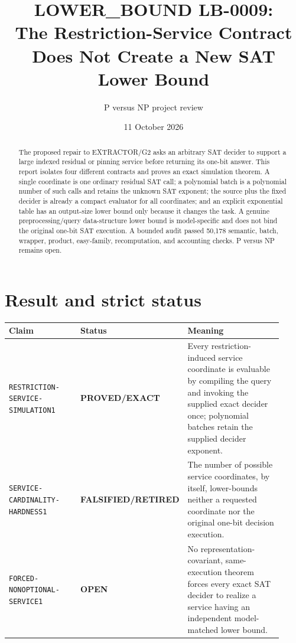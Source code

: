 \documentclass[11pt]{article}
\title{LOWER\_BOUND LB-0009:\\
The Restriction-Service Contract Does Not Create a New SAT Lower Bound}
\author{P versus NP project review}
\date{11 October 2026}
\newcommand{\OPEN}{\textbf{OPEN}}
\newcommand{\EXACT}{\textbf{PROVED/EXACT}}
\newcommand{\RETIRED}{\textbf{FALSIFIED/RETIRED}}
\begin{document}
\maketitle

\begin{abstract}
The proposed repair to EXTRACTOR/G2 asks an arbitrary SAT decider to support
a large indexed residual or pinning service before returning its one-bit
answer.  This report isolates four different contracts and proves an exact
simulation theorem.  A single coordinate is one ordinary residual SAT call;
a polynomial batch is a polynomial number of such calls and retains the
unknown SAT exponent; the source plus the fixed decider is already a compact
evaluator for all coordinates; and an explicit exponential table has an
output-size lower bound only because it changes the task.  A genuine
preprocessing/query data-structure lower bound is model-specific and does not
bind the original one-bit SAT execution.  A bounded audit passed 50,178
semantic, batch, wrapper, product, easy-family, recomputation, and accounting
checks.  P versus NP remains open.
\end{abstract}

\section{Result and strict status}

\begin{center}
\begin{tabular}{p{0.30\linewidth}p{0.17\linewidth}p{0.45\linewidth}}
\toprule
Claim & Status & Meaning\\
\midrule
\texttt{RESTRICTION-SERVICE-SIMULATION1} & \EXACT &
Every restriction-induced service coordinate is evaluable by compiling the
query and invoking the supplied exact decider once; polynomial batches retain
the supplied decider exponent.\\
\texttt{SERVICE-CARDINALITY-HARDNESS1} & \RETIRED &
The number of possible service coordinates, by itself, lower-bounds neither a
requested coordinate nor the original one-bit decision execution.\\
\texttt{FORCED-NONOPTIONAL-SERVICE1} & \OPEN &
No representation-covariant, same-execution theorem forces every exact SAT
decider to realize a service having an independent model-matched lower bound.\\
\bottomrule
\end{tabular}
\end{center}
\end{document}
